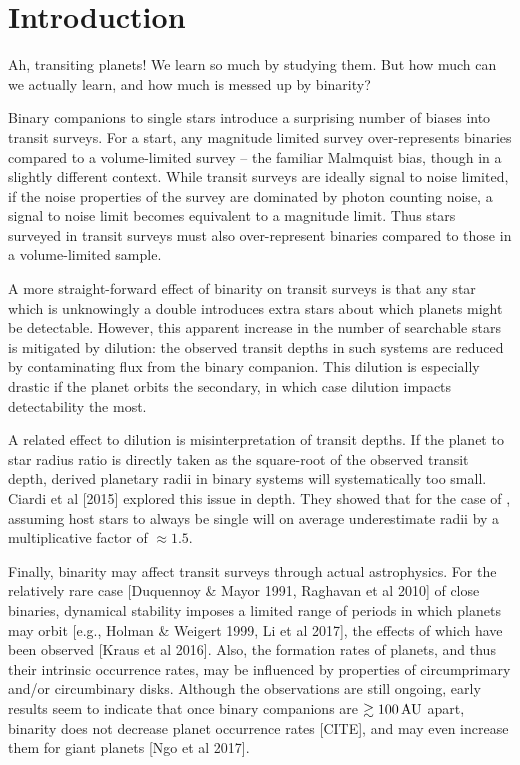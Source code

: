 \documentclass{emulateapj}
\begin{document}

\section{Introduction}

Ah, transiting planets! We learn so much by studying them. But how much can we 
actually learn, and how much is messed up by binarity?

Binary companions to single stars introduce a surprising number of biases into 
transit surveys.
For a start, any magnitude limited survey over-represents binaries compared to 
a volume-limited survey -- the familiar Malmquist bias, though in a slightly 
different context.
While transit surveys are ideally signal to noise limited, if the noise 
properties of the survey are dominated by photon counting noise, a signal to 
noise limit becomes equivalent to a magnitude limit.
Thus stars surveyed in transit surveys must also over-represent binaries 
compared to those in a volume-limited sample.

A more straight-forward effect of binarity on transit surveys is that any star 
which is unknowingly a double introduces extra stars about which planets might 
be detectable.
However, this apparent increase in the number of searchable stars is mitigated 
by dilution: the observed transit depths in such systems are reduced by 
contaminating flux from the binary companion. This dilution is especially 
drastic if the planet orbits the secondary, in which case dilution impacts 
detectability the most.

A related effect to dilution is misinterpretation of transit depths. If the 
planet to star radius ratio is directly taken as the square-root of 
the observed transit depth, derived planetary radii in binary systems will 
systematically too small.
Ciardi et al [2015] explored this issue in depth. They showed that for the case 
of \kepler, assuming host stars to always be single will on 
average underestimate radii by a multiplicative factor of $\approx 1.5$.

Finally, binarity may affect transit surveys through actual astrophysics.
For the relatively rare case [Duquennoy \& Mayor 1991, Raghavan et al 2010] of 
close binaries, dynamical stability imposes a limited range of periods in which 
planets may orbit [e.g., Holman \& Weigert 
1999, Li et al 2017], the effects of which have been observed [Kraus et al 
2016].
Also, the formation rates of planets, and thus their intrinsic occurrence 
rates, may be influenced by properties of circumprimary and/or circumbinary 
disks.
Although the observations are still ongoing, early results seem to indicate 
that once binary companions are $\gtrsim 100\,{\rm AU}$ apart, binarity does 
not decrease planet occurrence rates [CITE], and may even increase them for 
giant planets [Ngo et al 2017].
\end{document}
